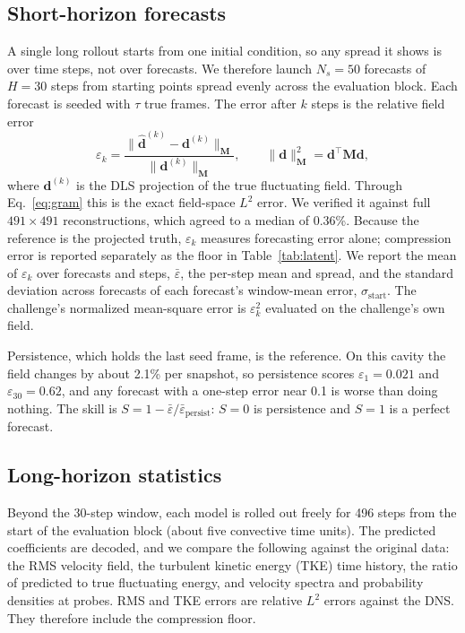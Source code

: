 \documentclass[conf]{new-aiaa}
\newcommand{\dvec}{\mathbf{d}}
\newcommand{\dhat}{\hat{\mathbf{d}}}
\begin{document}
\subsection{Short-horizon forecasts}
A single long rollout starts from one initial condition, so any spread it shows is over time steps, not over forecasts. We therefore launch $N_s=50$ forecasts of $H=30$ steps from starting points spread evenly across the evaluation block. Each forecast is seeded with $\tau$ true frames. The error after $k$ steps is the relative field error
\begin{equation}
  \varepsilon_k=\frac{\|\dhat^{(k)}-\dvec^{(k)}\|_{\mathbf{M}}}{\|\dvec^{(k)}\|_{\mathbf{M}}},\qquad \|\dvec\|_{\mathbf{M}}^2=\dvec^{\top}\mathbf{M}\dvec ,
  \label{eq:err}
\end{equation}
where $\dvec^{(k)}$ is the DLS projection of the true fluctuating field. Through Eq.~\eqref{eq:gram} this is the exact field-space $L^2$ error. We verified it against full $491\times491$ reconstructions, which agreed to a median of 0.36\%. Because the reference is the projected truth, $\varepsilon_k$ measures forecasting error alone; compression error is reported separately as the floor in Table~\ref{tab:latent}. We report the mean of $\varepsilon_k$ over forecasts and steps, $\bar\varepsilon$, the per-step mean and spread, and the standard deviation across forecasts of each forecast's window-mean error, $\sigma_\mathrm{start}$. The challenge's normalized mean-square error \cite{schmidt2026challenge} is $\varepsilon_k^2$ evaluated on the challenge's own field.

Persistence, which holds the last seed frame, is the reference. On this cavity the field changes by about 2.1\% per snapshot, so persistence scores $\varepsilon_1=0.021$ and $\varepsilon_{30}=0.62$, and any forecast with a one-step error near 0.1 is worse than doing nothing. The skill is $S=1-\bar\varepsilon/\bar\varepsilon_\mathrm{persist}$: $S=0$ is persistence and $S=1$ is a perfect forecast.

\subsection{Long-horizon statistics}
Beyond the 30-step window, each model is rolled out freely for 496 steps from the start of the evaluation block (about five convective time units). The predicted coefficients are decoded, and we compare the following against the original data: the RMS velocity field, the turbulent kinetic energy (TKE) time history, the ratio of predicted to true fluctuating energy, and velocity spectra and probability densities at probes. RMS and TKE errors are relative $L^2$ errors against the DNS. They therefore include the compression floor.
\end{document}
